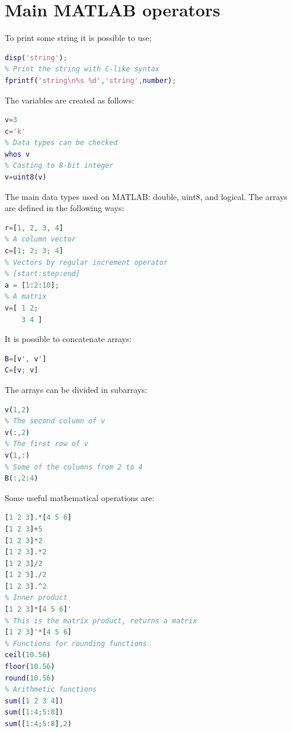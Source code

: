 \documentclass[12pt, a4paper]{report}
\newtheorem[style=M,bodystyle=\normalfont]{theorem}{Theorem}
\newtheorem[style=M,bodystyle=\normalfont]{corollary}{Corollary}
\newtheorem[style=M,bodystyle=\normalfont]{lemma}{Lemma}
\newtheorem[style=M,bodystyle=\normalfont]{definition}{Definition}
\begin{document}
    \section{Main MATLAB operators}
    To print some string it is possible to use; 
    \begin{lstlisting}[language=Matlab]
% Print the string
disp('string');
% Print the string with C-like syntax
fprintf('string\n%s %d','string',number);
    \end{lstlisting}
    The variables are created as follows: 
    \begin{lstlisting}[language=Matlab]
% Variables are created by assignements
v=3
c='k'
% Data types can be checked
whos v
% Casting to 8-bit integer
v=uint8(v)
    \end{lstlisting}
    The main data types used on MATLAB: double, uint8, and logical. The arrays are defined in the following ways: 
    \begin{lstlisting}[language=Matlab]
% A row vector
r=[1, 2, 3, 4]
% A column vector
c=[1; 2; 3; 4]
% Vectors by regular increment operator
% [start:step:end]
a = [1:2:10];
% A matrix
v=[ 1 2; 
    3 4 ]
    \end{lstlisting}
    It is possible to concatenate arrays: 
    \begin{lstlisting}[language=Matlab]
B=[v', v']
C=[v; v]        
    \end{lstlisting}
    The arrays can be divided in subarrays: 
    \begin{lstlisting}[language=Matlab]
% First row and second column 
v(1,2) 
% The second column of v
v(:,2)
% The first row of v
v(1,:) 
% Some of the columns from 2 to 4
B(:,2:4) 
    \end{lstlisting}
    Some useful mathematical operations are: 
    \begin{lstlisting}[language=Matlab]
% . means elementwise operation
[1 2 3].*[4 5 6]
[1 2 3]+5
[1 2 3]*2 
[1 2 3].*2 
[1 2 3]/2
[1 2 3]./2 
[1 2 3].^2 
% Inner product
[1 2 3]*[4 5 6]' 
% This is the matrix product, returns a matrix
[1 2 3]'*[4 5 6] 
% Functions for rounding functions
ceil(10.56)
floor(10.56)
round(10.56)
% Arithmetic functions
sum([1 2 3 4])
sum([1:4;5:8])
sum([1:4;5:8],2)
    \end{lstlisting}
\end{document}
